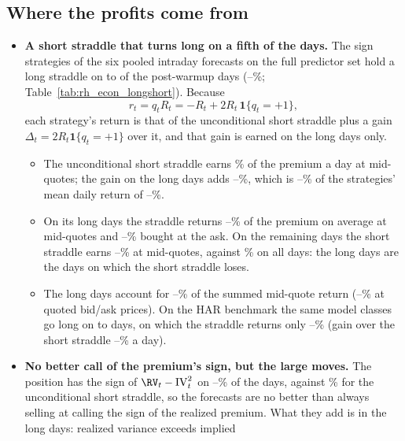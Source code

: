 \subsection{Where the profits come from}
\begin{itemize}
\item \textbf{A short straddle that turns long on a fifth of the days.} The sign strategies of the six pooled intraday
  forecasts on the full predictor set hold a long straddle on \rhedLongNMin{} to \rhedLongNMax{} of the \rheSzDays{}
  post-warmup days (\rhedLongPctMin--\rhedLongPctMax\%; Table~\ref{tab:rh_econ_longshort}). Because
  \[
    r_t = q_t R_t = -R_t + 2R_t\,\mathbf{1}\{q_t = +1\},
  \]
  each strategy's return is that of the unconditional short straddle plus a gain $\Delta_t = 2R_t\mathbf{1}\{q_t = +1\}$
  over it, and that gain is earned on the long days only.
  \begin{itemize}
  \item The unconditional short straddle earns \rhedUncShortMean\% of the premium a day at mid-quotes; the gain on the
    long days adds \rhedGainMin--\rhedGainMax\%, which is \rhedGainShareMin--\rhedGainShareMax\% of the strategies'
    mean daily return of \rhedMeanMin--\rhedMeanMax\%.
  \item On its long days the straddle returns \rhedLongMidMin--\rhedLongMidMax\% of the premium on average at
    mid-quotes and \rhedLongBaMin--\rhedLongBaMax\% bought at the ask. On the remaining days the short straddle earns
    \rhedShortMidMin--\rhedShortMidMax\% at mid-quotes, against \rhedUncShortMean\% on all days: the long days are the
    days on which the short straddle loses.
  \item The long days account for \rhedLongShareMin--\rhedLongShareMax\% of the summed mid-quote return
    (\rhedLongShareXMin--\rhedLongShareXMax\% at quoted bid/ask prices). On the HAR benchmark the same model classes go
    long on \rhedHarLongNMin{} to \rhedHarLongNMax{} days, on which the straddle returns only
    \rhedHarLongMidMin--\rhedHarLongMidMax\% (gain over the short straddle \rhedHarGainMin--\rhedHarGainMax\% a day).
  \end{itemize}
\item \textbf{No better call of the premium's sign, but the large moves.} The position has the sign of $\RV_t - \mathrm{IV}_t^2$ on \rhedHitMin--\rhedHitMax\% of the days, against
  \rhedUncShortHit\% for the unconditional short straddle, so the forecasts are no better than always selling at
  calling the sign of the realized premium. What they add is in the long days: realized variance exceeds implied

\end{itemize}
